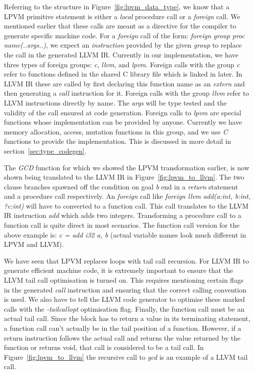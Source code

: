 Referring to the structure in Figure~\ref{fig:lpvm_data_type}, we know that a
LPVM primitive statement is either a \textit{local} procedure call or a
\textit{foreign} call. We mentioned earlier that these calls are meant as a
directive for the compiler to generate specific machine code. For a
\textit{foreign} call of the form: \textit{foreign group proc\textunderscore
  name(..args..)}, we expect an \textit{instruction} provided by the given
\textit{group} to replace the call in the generated LLVM IR. Currently in our
implementation, we have three types of foreign groups: \textit{c},
\textit{llvm}, and \textit{lpvm}. Foreign calls with the group \textit{c} refer
to functions defined in the shared C library file which is linked in later. In
LLVM IR these are called by first declaring this function name as an
\textit{extern} and then generating a \textit{call} instruction for it. Foreign
calls with the group \textit{llvm} refer to LLVM instructions directly by
name. The \textit{args} will be type tested and the validity of the call
ensured at code generation. Foreign calls to \textit{lpvm} are special
functions whose implementation can be provided by anyone. Currently we have
memory allocation, access, mutation functions in this group, and we use
\textit{C} functions to provide the implementation. This is discussed in more
detail in section~\ref{sec:type_codegen}.

The \textit{GCD} function for which we showed the LPVM transformation earlier,
is now shown being translated to the LLVM IR in
Figure~\ref{fig:lpvm_to_llvm}. The two clause branches spawned off the
condition on goal \textit{b} end in a \textit{return} statement and a procedure
call respectively. An \textit{foreign} call like \textit{foreign llvm
  add(a:int, b:int, ?c:int)} will have to converted to a function call. This
call translates to the LLVM IR instruction \textit{add} which adds two
integers. Transforming a procedure call to a function call is quite direct in
most scenarios. The function call version for the above example is: \textit{c =
  add i32 a, b} (actual variable names look much different in LPVM and LLVM).

We have seen that LPVM replaces loops with tail call recursion. For LLVM IR to
generate efficient machine code, it is extremely important to ensure that the
LLVM tail call optimisation is turned on. This requires mentioning certain
flags in the generated \textit{call} instruction and ensuring that the correct
calling convention is used. We also have to tell the LLVM code generator to
optimise these marked calls with the \textit{-tailcallopt} optimisation
flag. Finally, the function call must be an actual tail call. Since the block
has to return a value in its terminating statement, a function call can't
actually be in the tail position of a function. However, if a return
instruction follows the actual call and returns the value returned by the
function or returns void, that call is considered to be a tail call. In
Figure~\ref{fig:lpvm_to_llvm} the recursive call to \textit{gcd} is an example
of a LLVM tail call.



